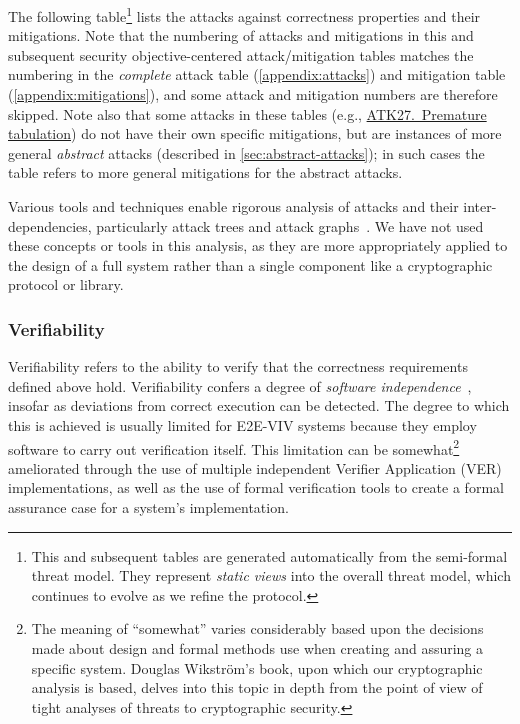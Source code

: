 \documentclass[10pt,letterpaper]{article}
\begin{document}


The following table\footnote{This and subsequent tables are generated automatically from the semi-formal threat model. They represent \emph{static views} into the overall threat model, which continues to evolve as we refine the protocol.} lists the attacks against correctness properties and their mitigations. Note that the numbering of attacks and mitigations in this and subsequent security objective-centered attack/mitigation tables matches the numbering in the \emph{complete} attack table (\autoref{appendix:attacks}) and mitigation table (\autoref{appendix:mitigations}), and some attack and mitigation numbers are therefore skipped. Note also that some attacks in these tables (e.g., \hyperlink{ATK27}{ATK27.~Premature tabulation}) do not have their own specific mitigations, but are instances of more general \emph{abstract} attacks (described in \autoref{sec:abstract-attacks}); in such cases the table refers to more general mitigations for the abstract attacks.

Various tools and techniques enable rigorous analysis of attacks and their inter-dependencies, particularly attack trees and attack graphs~\cite{BruceSchneierAttackTrees1999,KonstaSurveyAutomaticGeneration2023,NguyenAutomatedAttack2020}. We have not used these concepts or tools in this analysis, as they are more appropriately applied to the design of a full system rather than a single component like a cryptographic protocol or library.



\subsubsection{Verifiability}

Verifiability refers to the ability to verify that the correctness requirements defined above hold. Verifiability confers a degree of \emph{software independence}~\cite{RivestVirzaSoftwareIndependence2016}, insofar as deviations from correct execution can be detected. The degree to which this is achieved is usually limited for E2E-VIV systems because they employ software to carry out verification itself. This limitation can be somewhat\footnote{The meaning of ``somewhat'' varies considerably based upon the decisions made about design and formal methods use when creating and assuring a specific system. Douglas Wikstr\"{o}m's book, upon which our cryptographic analysis is based, delves into this topic in depth from the point of view of tight analyses of threats to cryptographic security.} ameliorated through the use of multiple independent Verifier Application (VER) implementations, as well as the use of formal verification tools to create a formal assurance case for a system's implementation.
\end{document}
